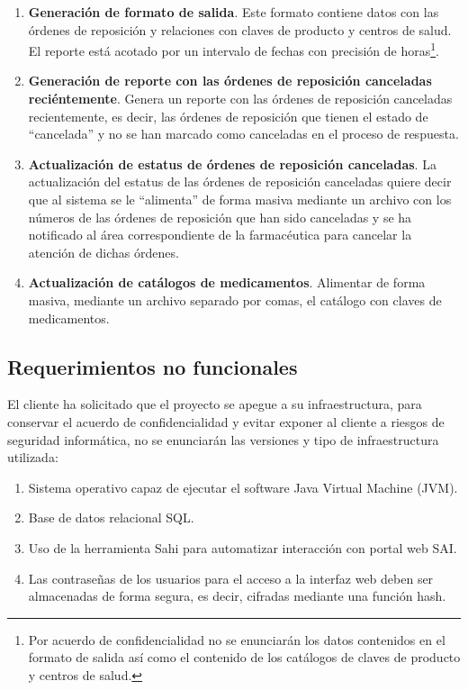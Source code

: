 \begin{enumerate}
\item \textbf{Generación de formato de salida}. Este formato contiene datos con las órdenes de reposición y relaciones con claves de producto y centros de salud. El reporte está acotado por un intervalo de fechas con precisión de horas\footnote{Por acuerdo de confidencialidad no se enunciarán los datos contenidos en el formato de salida así como el contenido de los catálogos de claves de producto y centros de salud.}.
\item \textbf{Generación de reporte con las órdenes de reposición canceladas reciéntemente}. Genera un reporte con las órdenes de reposición canceladas recientemente, es decir, las órdenes de reposición que tienen el estado de “cancelada” y no se han marcado como canceladas en el proceso de respuesta.
\item \textbf{Actualización de estatus de órdenes de reposición canceladas}. La actualización del estatus de las órdenes de reposición canceladas quiere decir que al sistema se le ``alimenta'' de forma masiva mediante un archivo con los números de las órdenes de reposición que han sido canceladas y se ha notificado al área correspondiente de la farmacéutica para cancelar la atención de dichas órdenes.
\item \textbf{Actualización de catálogos de medicamentos}. Alimentar de forma masiva, mediante un archivo separado por comas, el catálogo con claves de medicamentos.
\end{enumerate}


\subsection{Requerimientos no funcionales}
El cliente ha solicitado que el proyecto se apegue a su infraestructura, para conservar el acuerdo de confidencialidad y evitar exponer al cliente a riesgos de seguridad informática, no se enunciarán las versiones y tipo de infraestructura utilizada:
\begin{enumerate}
\item Sistema operativo capaz de ejecutar el software Java Virtual Machine (JVM).
\item Base de datos relacional SQL.
\item Uso de la herramienta Sahi para automatizar interacción con portal web SAI.
\item Las contraseñas de los usuarios para el acceso a la interfaz web deben ser almacenadas de forma segura, es decir, cifradas mediante una función hash.
\end{enumerate}


